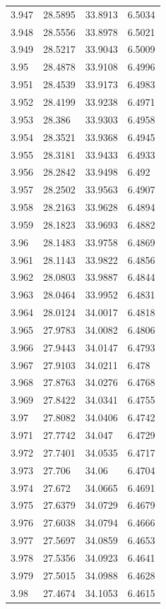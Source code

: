 \begin{tabular}{llll}
3.947 & 28.5895 & 33.8913 & 6.5034 \\
3.948 & 28.5556 & 33.8978 & 6.5021 \\
3.949 & 28.5217 & 33.9043 & 6.5009 \\
3.95 & 28.4878 & 33.9108 & 6.4996 \\
3.951 & 28.4539 & 33.9173 & 6.4983 \\
3.952 & 28.4199 & 33.9238 & 6.4971 \\
3.953 & 28.386 & 33.9303 & 6.4958 \\
3.954 & 28.3521 & 33.9368 & 6.4945 \\
3.955 & 28.3181 & 33.9433 & 6.4933 \\
3.956 & 28.2842 & 33.9498 & 6.492 \\
3.957 & 28.2502 & 33.9563 & 6.4907 \\
3.958 & 28.2163 & 33.9628 & 6.4894 \\
3.959 & 28.1823 & 33.9693 & 6.4882 \\
3.96 & 28.1483 & 33.9758 & 6.4869 \\
3.961 & 28.1143 & 33.9822 & 6.4856 \\
3.962 & 28.0803 & 33.9887 & 6.4844 \\
3.963 & 28.0464 & 33.9952 & 6.4831 \\
3.964 & 28.0124 & 34.0017 & 6.4818 \\
3.965 & 27.9783 & 34.0082 & 6.4806 \\
3.966 & 27.9443 & 34.0147 & 6.4793 \\
3.967 & 27.9103 & 34.0211 & 6.478 \\
3.968 & 27.8763 & 34.0276 & 6.4768 \\
3.969 & 27.8422 & 34.0341 & 6.4755 \\
3.97 & 27.8082 & 34.0406 & 6.4742 \\
3.971 & 27.7742 & 34.047 & 6.4729 \\
3.972 & 27.7401 & 34.0535 & 6.4717 \\
3.973 & 27.706 & 34.06 & 6.4704 \\
3.974 & 27.672 & 34.0665 & 6.4691 \\
3.975 & 27.6379 & 34.0729 & 6.4679 \\
3.976 & 27.6038 & 34.0794 & 6.4666 \\
3.977 & 27.5697 & 34.0859 & 6.4653 \\
3.978 & 27.5356 & 34.0923 & 6.4641 \\
3.979 & 27.5015 & 34.0988 & 6.4628 \\
3.98 & 27.4674 & 34.1053 & 6.4615 \\

\end{tabular}
